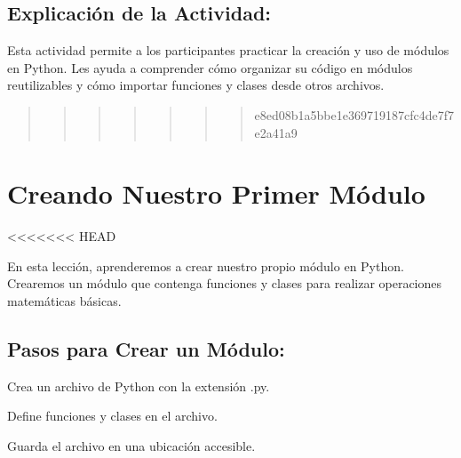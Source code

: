 \documentclass[
  a4paper,
  onepage,
  openany]{scrreprt}
\begin{document}
\hypertarget{explicaciuxf3n-de-la-actividad-57}{%
\section{Explicación de la
Actividad:}\label{explicaciuxf3n-de-la-actividad-57}}

Esta actividad permite a los participantes practicar la creación y uso
de módulos en Python. Les ayuda a comprender cómo organizar su código en
módulos reutilizables y cómo importar funciones y clases desde otros
archivos.

\begin{quote}
\begin{quote}
\begin{quote}
\begin{quote}
\begin{quote}
\begin{quote}
\begin{quote}
e8ed08b1a5bbe1e369719187cfc4de7f7e2a41a9
\end{quote}
\end{quote}
\end{quote}
\end{quote}
\end{quote}
\end{quote}
\end{quote}

\hypertarget{creando-nuestro-primer-muxf3dulo}{%
\chapter{Creando Nuestro Primer
Módulo}\label{creando-nuestro-primer-muxf3dulo}}

\textless\textless\textless\textless\textless\textless\textless{} HEAD

En esta lección, aprenderemos a crear nuestro propio módulo en Python.
Crearemos un módulo que contenga funciones y clases para realizar
operaciones matemáticas básicas.

\hypertarget{pasos-para-crear-un-muxf3dulo}{%
\section{Pasos para Crear un
Módulo:}\label{pasos-para-crear-un-muxf3dulo}}

Crea un archivo de Python con la extensión .py.

Define funciones y clases en el archivo.

Guarda el archivo en una ubicación accesible.
\end{document}
